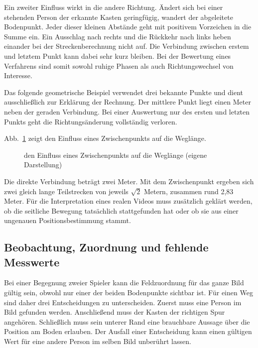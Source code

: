 Ein zweiter Einfluss wirkt in die andere Richtung. Ändert sich bei einer stehenden Person der erkannte Kasten geringfügig, wandert der abgeleitete Bodenpunkt. Jeder dieser kleinen Abstände geht mit positivem Vorzeichen in die Summe ein. Ein Ausschlag nach rechts und die Rückkehr nach links heben einander bei der Streckenberechnung nicht auf. Die Verbindung zwischen erstem und letztem Punkt kann dabei sehr kurz bleiben. Bei der Bewertung eines Verfahrens sind somit sowohl ruhige Phasen als auch Richtungswechsel von Interesse.

Das folgende geometrische Beispiel verwendet drei bekannte Punkte und dient ausschließlich zur Erklärung der Rechnung. Der mittlere Punkt liegt einen Meter neben der geraden Verbindung. Bei einer Auswertung nur des ersten und letzten Punkts geht die Richtungsänderung vollständig verloren.

Abb.~\ref{abb:em-bogen} zeigt den Einfluss eines Zwischenpunkts auf die Weglänge.
\begin{figure}[htbp]\centering
{}
\caption{den Einfluss eines Zwischenpunkts auf die Weglänge (eigene Darstellung)}\label{abb:em-bogen}\end{figure}
Die direkte Verbindung beträgt zwei Meter. Mit dem Zwischenpunkt ergeben sich zwei gleich lange Teilstrecken von jeweils $\sqrt{2}$ Metern, zusammen rund 2,83 Meter. Für die Interpretation eines realen Videos muss zusätzlich geklärt werden, ob die seitliche Bewegung tatsächlich stattgefunden hat oder ob sie aus einer ungenauen Positionsbestimmung stammt.

\subsection{Beobachtung, Zuordnung und fehlende Messwerte}
Bei einer Begegnung zweier Spieler kann die Feldzuordnung für das ganze Bild gültig sein, obwohl nur einer der beiden Bodenpunkte sichtbar ist. Für einen Weg sind daher drei Entscheidungen zu unterscheiden. Zuerst muss eine Person im Bild gefunden werden. Anschließend muss der Kasten der richtigen Spur angehören. Schließlich muss sein unterer Rand eine brauchbare Aussage über die Position am Boden erlauben. Der Ausfall einer Entscheidung kann einen gültigen Wert für eine andere Person im selben Bild unberührt lassen.

